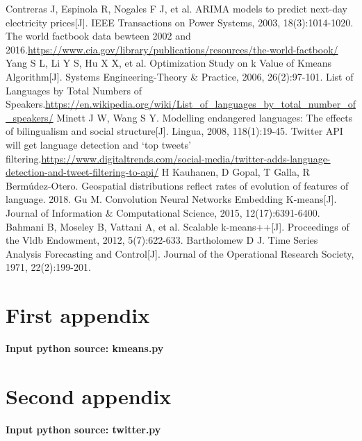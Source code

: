\documentclass{mcmthesis}
\begin{document}
  \begin{thebibliography}{99}
  Contreras J, Espinola R, Nogales F J, et al. ARIMA models to predict next-day electricity prices[J]. IEEE Transactions on Power Systems, 2003, 18(3):1014-1020.
  The world factbook data bewteen 2002 and 2016.\url{https://www.cia.gov/library/publications/resources/the-world-factbook/}
  Yang S L, Li Y S, Hu X X, et al. Optimization Study on k Value of Kmeans Algorithm[J]. Systems Engineering-Theory \& Practice, 2006, 26(2):97-101.
  List of Languages by Total Numbers of Speakers.\url{https://en.wikipedia.org/wiki/List_of_languages_by_total_number_of_speakers/}
  Minett J W, Wang S Y. Modelling endangered languages: The effects of bilingualism and social structure[J]. Lingua, 2008, 118(1):19-45.
  Twitter API will get language detection and ‘top tweets’ filtering.\url{https://www.digitaltrends.com/social-media/twitter-adds-language-detection-and-tweet-filtering-to-api/}
  H Kauhanen, D Gopal, T Galla, R Bermúdez-Otero. Geospatial distributions reflect rates of evolution of features of language. 2018.
  Gu M. Convolution Neural Networks Embedding K-means[J]. Journal of Information \& Computational Science, 2015, 12(17):6391-6400.
  Bahmani B, Moseley B, Vattani A, et al. Scalable k-means++[J]. Proceedings of the Vldb Endowment, 2012, 5(7):622-633.
  Bartholomew D J. Time Series Analysis Forecasting and Control[J]. Journal of the Operational Research Society, 1971, 22(2):199-201.
  \end{thebibliography}
  \begin{appendices}
  
  
  \section{First appendix}
  
  \textbf{\textcolor[rgb]{0.98,0.00,0.00}{Input python source: kmeans.py}} 
  
  \section{Second appendix}
  \textbf{\textcolor[rgb]{0.98,0.00,0.00}{Input python source: twitter.py}} 
  
  
  \end{appendices}
  
\end{document}
